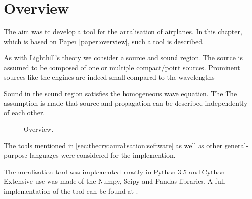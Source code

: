 \section{Overview}

The aim was to develop a tool for the auralisation of airplanes. In this chapter, which is based on Paper \ref{paper:overview}, such a tool is described.

As with Lighthill's theory we consider a source and sound region. The source is assumed to be composed of one or multiple compact/point sources.
Prominent sources like the engines are indeed small compared to the wavelengths


Sound in the sound region satisfies the homogeneous wave equation.
The
The assumption is made that source and propagation can be 
described independently of each other. 


\begin{figure}[H]
  \centering
{}
  \caption{Overview.}
  \label{fig:implementation:overview}
\end{figure}

The tools mentioned in \ref{sec:theory:auralisation:software} as well as other
general-purpose languages were considered for the implemention.

The auralisation tool was implemented mostly in Python 3.5 \cite{Python} and
Cython \cite{Behnel2011,Cython}. Extensive use was made of the
Numpy\cite{VanderWalt2011,Numpy}, Scipy\cite{Scipy} and
Pandas\cite{Mckinney2010} libraries. A full implementation of the tool can be
found at \cite{Rietdijk2017d}.
